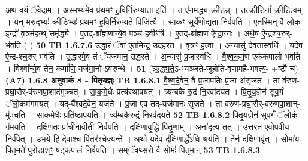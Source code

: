 \documentclass[17pt]{extarticle}
\begin{document}
                  अथ॑ व॒यं ॅवे॑दाम । अ॒स्मभ्य॑मे॒व प्र॑थ॒मꣳ ह॒विर्निरु॑प्याता॒ इति॑ । त ए॑न॒मद्ध्य॑-क्रीडन्न् । तत्क्री॒डिनां᳚ क्रीडि॒त्वम् । यन् म॒रुद्भ्यः॑ क्री॒डिभ्यः॑ प्रथ॒मꣳ ह॒विर्नि॑रु॒प्यते॒ विजि॑त्यै । सा॒कꣳ सूर्ये॑णोद्य॒ता निर्व॑पति । ए॒तस्मि॒न् वै लो॒क इन्द्रो॑ वृ॒त्रम॑ह॒न्थ् समृ॑द्ध्यै । ए॒तद्-ब्रा᳚ह्मणान्ये॒व पञ्च॑ ह॒वीꣳषि॑ । ए॒तद्-ब्रा᳚ह्मण ऐन्द्रा॒ग्नः । अथै॒ष ऐ॒न्द्रश्च॒रुर्-भ॑वति ( ) \textbf{ 50} \newline
                  \newline
                                \textbf{ TB 1.6.7.6} \newline
                  उ॒द्धा॒रं ॅवा ए॒तमिन्द्र॒ उद॑हरत । वृ॒त्रꣳ ह॒त्वा । अ॒न्यासु॑ दे॒वता॒स्वधि॑ । यदे॒ष ऐ॒न्द्र-श्च॒रुर् भव॑ति । उ॒द्धा॒रमे॒व तं ॅयज॑मान॒ उद्ध॑रते । अ॒न्यासु॑ प्र॒जास्वधि॑ । वै॒श्व॒क॒र्म॒ण एक॑कपालो भवति । विश्वा᳚न्ये॒व तेन॒ कर्मा॑णि॒ यज॑मा॒नो ऽव॑रुन्धे । \textbf{ 51} \newline
                  \newline
                                    (ऋ॒द्ध्य॒ते॒ऽ-भ्य॑ञ्जते-जुहोति-वृणामहै-भवत्य॒- +ष्टौ च॑) \textbf{(A7)} \newline \newline
                \textbf{ 1.6.8     अनुवाकं   8 - पितृयज्ञ्ः} \newline
                                \textbf{ TB 1.6.8.1} \newline
                  वै॒श्व॒दे॒वेन॒ वै प्र॒जाप॑तिः प्र॒जा अ॑सृजत । ता व॑रुण-प्रघा॒सैर्-व॑रुणपा॒शाद॑मुञ्चत् । सा॒क॒मे॒धैः प्रत्य॑स्थापयत् । त्र्य॑म्बकै रु॒द्रं नि॒रवा॑दयत । पि॒तृ॒य॒ज्ञेन॑ सुव॒र्गं ॅलो॒कम॑गमयत् । यद्-वै᳚श्वदे॒वेन॒ यज॑ते । प्र॒जा ए॒व तद्-यज॑मानः सृजते । ता व॑रुण-प्रघा॒सैर्-व॑रुणपा॒शान्-मु॑ञ्चति । सा॒क॒मे॒धैः प्रति॑ष्ठापयति । त्र्य॑म्बकैरु॒द्रं नि॒रव॑दयते \textbf{ 52} \newline
                  \newline
                                \textbf{ TB 1.6.8.2} \newline
                  पि॒तृ॒य॒ज्ञेन॑ सुव॒र्गं ॅलो॒कं ग॑मयति । द॒क्षि॒ण॒तः प्रा॑चीनावी॒ती निर्व॑पति । द॒क्षि॒णावृ॒द्धि पि॑तृ॒णाम् । अना॑दृत्य॒ तत् । उ॒त्त॒र॒त ए॒वोप॒वीय॒ निर्व॑पेत् । उ॒भये॒ हि दे॒वाश्च॑ पि॒तर॑श्चे॒ज्यन्ते᳚ । अथो॒ यदे॒व द॑क्षिणा॒र्द्धे॑ऽधि॒ श्रय॑ति । तेन॑ दक्षि॒णावृ॑त् । सोमा॑य पितृ॒मते॑ पुरो॒डाशꣳ॒॒ षट्क॑पालं॒ निर्व॑पति । स॒म्ॅव॒थ्स॒रो वै सोमः॑ पितृ॒मान् \textbf{ 53} \newline
                  \newline
                                \textbf{ TB 1.6.8.3} \newline
\end{document}
